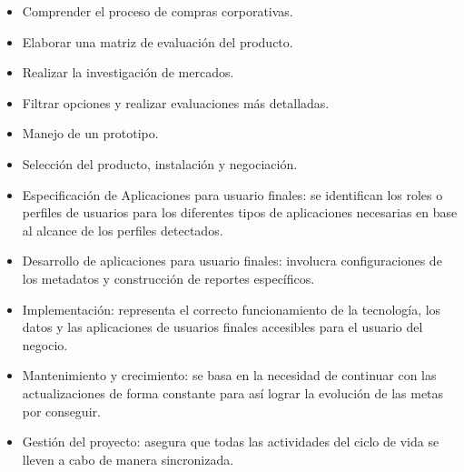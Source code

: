 \documentclass[11pt,a4paper]{article}
\begin{document}
		\begin{itemize}
			\item Comprender el proceso de compras corporativas.
			
			\item Elaborar una matriz de evaluación del producto.
			
			\item Realizar la investigación de mercados.
			
			\item Filtrar opciones y realizar evaluaciones más detalladas.
			
			\item Manejo de un prototipo.
			
			\item Selección del producto, instalación y negociación.
			
			\item Especificación de Aplicaciones para usuario finales: se identifican los roles o perfiles de usuarios para los diferentes tipos de aplicaciones necesarias en base al alcance de los perfiles detectados.
			
			\item Desarrollo de aplicaciones para usuario finales: involucra configuraciones de los metadatos y construcción de reportes específicos.
			
			\item Implementación: representa el correcto funcionamiento de la tecnología, los datos y las aplicaciones de usuarios finales accesibles para el usuario del negocio.
			
			\item Mantenimiento y crecimiento: se basa en la necesidad de continuar con las actualizaciones de forma constante para así lograr la evolución de las metas por conseguir.
			
			\item Gestión del proyecto: asegura que todas las actividades del ciclo de vida se lleven a cabo de manera sincronizada.
		\end{itemize}
		
\end{document}
